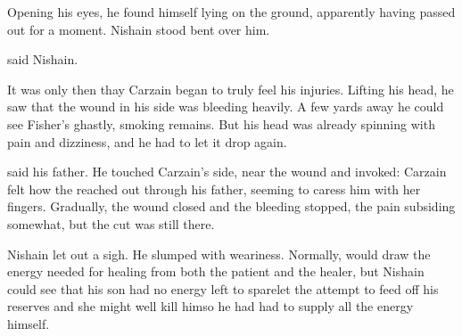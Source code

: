 \begin{comment}
\subsection{Aftermath}
\end{comment}


Opening his eyes, he found himself lying on the ground, apparently having passed out for a moment. 
Nishain stood bent over him. 



 said Nishain. 


It was only then thay Carzain began to truly feel his injuries. 
Lifting his head, he saw that the wound in his side was bleeding heavily. 
A few yards away he could see Fisher's ghastly, smoking remains. 
But his head was already spinning with pain and dizziness, and he had to let it drop again. 


 said his father. 
He touched Carzain's side, near the wound and invoked: 
Carzain felt how the \Sephirah{} reached out through his father, seeming to caress him with her fingers. 
Gradually, the wound closed and the bleeding stopped, the pain subsiding somewhat, but the cut was still there. 

Nishain let out a sigh. 
He slumped with weariness. 
Normally, \Ishiel{} would draw the energy needed for healing from both the patient and the healer, but Nishain could see that his son had no energy left to spare\dash{}let the \Sephirah{} attempt to feed off his reserves and she might well kill him\dash{}so he had had to supply all the energy himself. 

